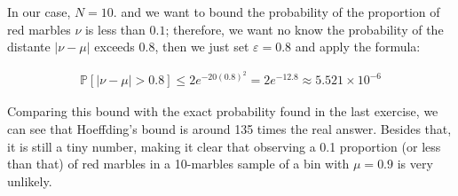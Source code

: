 \documentclass[12pt,letterpaper]{article}
\begin{document}
	In our case, $N=10$. and we want to bound the probability of the proportion of red marbles $\nu$ is less than $0.1$; therefore, we want no know the probability of the distante $|\nu-\mu|$ exceeds $0.8$, then we just set $\varepsilon=0.8$ and apply the formula:
	
	\begin{align*}
		\mathbb{P}[|\nu-\mu|>0.8]\leq 2 e^{-20(0.8)^2}=2e^{-12.8}\approx 5.521 \times 10^{-6}
	\end{align*}
	
	Comparing this bound with the exact probability found in the last exercise, we can see that Hoeffding's bound is around 135 times the real answer. Besides that, it is still a tiny number, making it clear that observing a 0.1 proportion (or less than that) of red marbles in a 10-marbles sample of a bin with $\mu=0.9$ is very unlikely. 
\newpage



\end{document}
